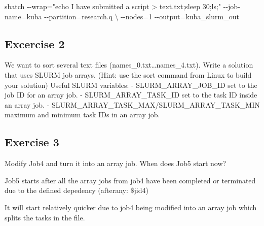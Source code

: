 \documentclass[]{article}
\newenvironment{Shaded}{\begin{snugshade}}{\end{snugshade}}
\newcommand{\BuiltInTok}[1]{#1}
\newcommand{\CommentTok}[1]{\textcolor[rgb]{0.56,0.35,0.01}{\textit{#1}}}
\newcommand{\ExtensionTok}[1]{#1}
\newcommand{\FunctionTok}[1]{\textcolor[rgb]{0.00,0.00,0.00}{#1}}
\newcommand{\NormalTok}[1]{#1}
\newcommand{\OperatorTok}[1]{\textcolor[rgb]{0.81,0.36,0.00}{\textbf{#1}}}
\newcommand{\StringTok}[1]{\textcolor[rgb]{0.31,0.60,0.02}{#1}}
\newcommand{\VariableTok}[1]{\textcolor[rgb]{0.00,0.00,0.00}{#1}}
\begin{document}
\begin{Shaded}
\begin{Highlighting}[]
\ExtensionTok{sbatch}\NormalTok{ {-}{-}wrap=}\StringTok{"echo \textquotesingle{}I have submitted a script\textquotesingle{} > text.txt;sleep 30;ls;"}\NormalTok{ {-}{-}job{-}name=kuba {-}{-}partition=research.q \textbackslash{}}
\NormalTok{                  {-}{-}nodes=1 {-}{-}output=kuba\_slurm\_out}
\end{Highlighting}
\end{Shaded}

\hypertarget{excercise-2}{%
\subsection{Excercise 2}\label{excercise-2}}

We want to sort several text files (names\_0.txt\ldots names\_4.txt).
Write a solution that uses SLURM job arrays. (Hint: use the sort command
from Linux to build your solution) Useful SLURM variables: -
SLURM\_ARRAY\_JOB\_ID set to the job ID for an array job. -
SLURM\_ARRAY\_TASK\_ID set to the task ID inside an array job. -
SLURM\_ARRAY\_TASK\_MAX/SLURM\_ARRAY\_TASK\_MIN maximum and minimum task
IDs in an array job.

\begin{Shaded}
\end{Shaded}

\hypertarget{exercise-3}{%
\subsection{Exercise 3}\label{exercise-3}}

Modify Job4 and turn it into an array job. When does Job5 start now?

Job5 starts after all the array jobs from job4 have been completed or
terminated due to the defined depedency (afterany: \$jid4)

It will start relatively quicker due to job4 being modified into an
array job which splits the tasks in the file.
\end{document}
